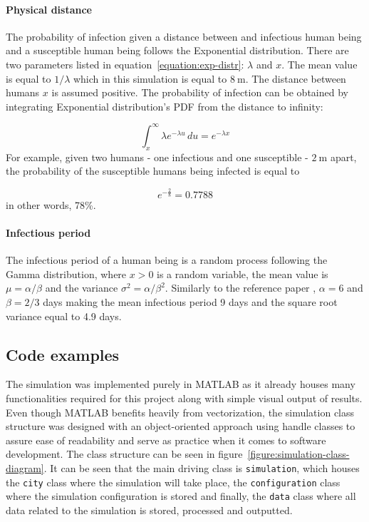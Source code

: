 \documentclass[a4paper]{article}
\newcommand{\code}{\texttt}
\begin{document}
\paragraph{Physical distance}
The probability of infection given a distance between and infectious human being and a susceptible human being follows the Exponential distribution. There are two parameters listed in equation~\ref{equation:exp-distr}: $\lambda$ and $x$. The mean value is equal to $1/\lambda$ which in this simulation is equal to $8\:\textrm{m}$. The distance between humans $x$ is assumed positive. The probability of infection can be obtained by integrating Exponential distribution's PDF from the distance to infinity:

\begin{equation}
	\int_{x}^{\infty} \lambda e^{-\lambda u} \,du = e^{-\lambda x} 
\end{equation}
\noindent
For example, given two humans - one infectious and one susceptible - $2\:\textrm{m}$ apart, the probability of the susceptible humans being infected is equal to

\begin{equation}
	e^{- \frac{2}{8}} = 0.7788
\end{equation}
\noindent
in other words, 78\%.

\paragraph{Infectious period}
The infectious period of a human being is a random process following the Gamma distribution, where $x > 0$ is a random variable, the mean value is $\mu = \alpha/\beta$ and the variance $ \sigma^2 = \alpha/\beta^2$. Similarly to the reference paper \cite{Maltezos2021}, $\alpha = 6$ and $\beta = 2/3$ days making the mean infectious period 9 days and the square root variance equal to 4.9 days.



\subsection{Code examples}
The simulation was implemented purely in MATLAB as it already houses many functionalities required for this project along with simple visual output of results. Even though MATLAB benefits heavily from vectorization, the simulation class structure was designed with an object-oriented approach using handle classes to assure ease of readability and serve as practice when it comes to software development. The class structure can be seen in figure~\ref{figure:simulation-class-diagram}. It can be seen that the main driving class is \code{simulation}, which houses the \code{city} class where the simulation will take place, the \code{configuration} class where the simulation configuration is stored and finally, the \code{data} class where all data related to the simulation is stored, processed and outputted.
\end{document}
